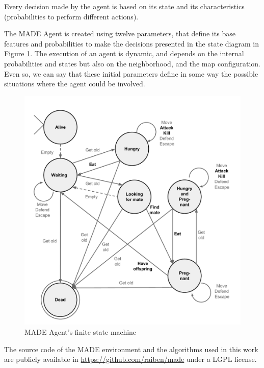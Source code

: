 \documentclass[letterpaper]{article}
\begin{document}
Every
decision made by the agent is based on its state and its
characteristics (probabilities to perform different actions). 





The MADE Agent is created using twelve parameters, that define its
base features and probabilities to make the decisions presented in the
state diagram in Figure \ref{fig:fsm}. The execution of an
agent is dynamic, and depends on the internal probabilities and states
but also on the neighborhood, and the map configuration. Even so, we
can say that these initial parameters define in some way the possible
situations where the agent could be involved.

\begin{figure}
\begin{center}
\includegraphics[scale=0.35]{img/fsm.pdf}
\caption{MADE Agent's finite state machine}
\label{fig:fsm}
\end{center}
\end{figure}



The source code of the MADE environment and the algorithms used in this work are publicly available in \url{https://github.com/raiben/made} under a LGPL license.
\end{document}

